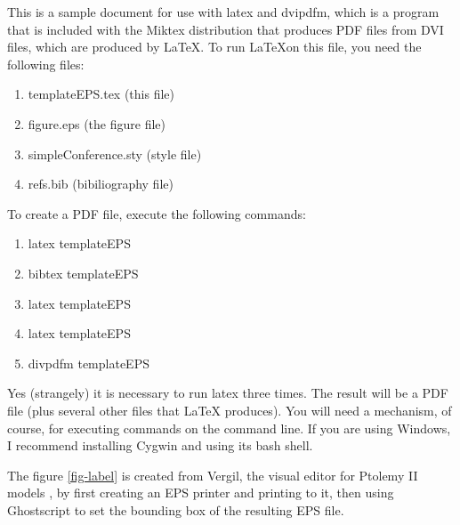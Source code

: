 \documentclass[10pt,twocolumn]{article}
\begin{document}
This is a sample document for use with latex and dvipdfm, which is
a program that is included with the Miktex distribution
that produces PDF files from DVI files, which are produced by \LaTeX.
To run \LaTeX on this file, you need the following files:
\begin{enumerate}
\item templateEPS.tex (this file)
\item figure.eps (the figure file)
\item simpleConference.sty (style file)
\item refs.bib (bibiliography file)
\end{enumerate}
\noindent
To create a PDF file, execute the following commands:
\begin{enumerate}
\item latex templateEPS
\item bibtex templateEPS
\item latex templateEPS
\item latex templateEPS
\item divpdfm templateEPS
\end{enumerate}
\noindent
Yes (strangely) it is necessary to run latex three times.
The result will be a PDF file (plus several other files that \LaTeX
produces).  You will need a mechanism, of course, for executing
commands on the command line. If you are using Windows, I recommend
installing Cygwin and using its bash shell.

The figure \ref{fig-label} is created from Vergil, the visual
editor for Ptolemy II models \cite{PtolemyVol1:04}, by first
creating an EPS printer and printing to it, then using Ghostscript
to set the bounding box of the resulting EPS file.



\end{document}
